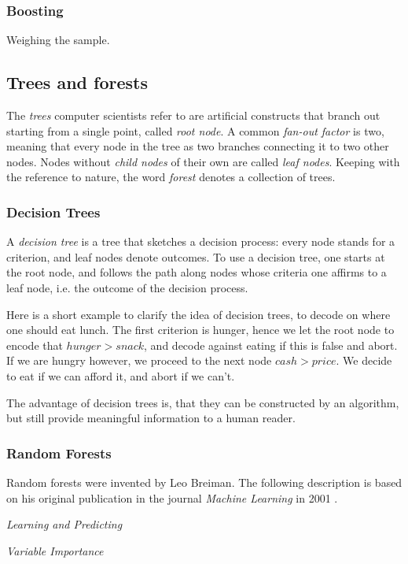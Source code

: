 \documentclass[a4paper,man,12pt,apacite]{apa6} %
\begin{document}
\subsubsection{Boosting}
Weighing the sample.

\subsection{Trees and forests}
The \emph{trees} computer scientists refer to are artificial constructs that
branch out starting from a single point, called \emph{root node}.
A common \emph{fan-out factor} is two, meaning that every node in the tree
as two branches connecting it to two other nodes.
Nodes without \emph{child nodes} of their own are called \emph{leaf nodes}.
Keeping with the reference to nature, the word \emph{forest} denotes a
collection of trees.

\subsubsection{Decision Trees}
A \emph{decision tree} is a tree that sketches a decision process: every
node stands for a criterion, and leaf nodes denote outcomes.
To use a decision tree, one starts at the root node, and follows the path
along nodes whose criteria one affirms to a leaf node, i.e. the outcome of
the decision process.

Here is a short example to clarify the idea of decision trees, to decode
on where one should eat lunch.
The first criterion is hunger, hence we let the root node to encode that
\( hunger > snack \), and decode against eating if this is false and abort.
If we are hungry however, we proceed to the next node \( cash > price \).
We decide to eat if we can afford it, and abort if we can't.

The advantage of decision trees is, that they can be constructed by an
algorithm, but still provide meaningful information to a human reader.

\subsubsection{Random Forests}
Random forests were invented by Leo Breiman.
The following description is based on his original publication in the
journal \emph{Machine Learning} in 2001 \cite{breiman2001random}.

\emph{Learning and Predicting}

\emph{Variable Importance}
\end{document}
